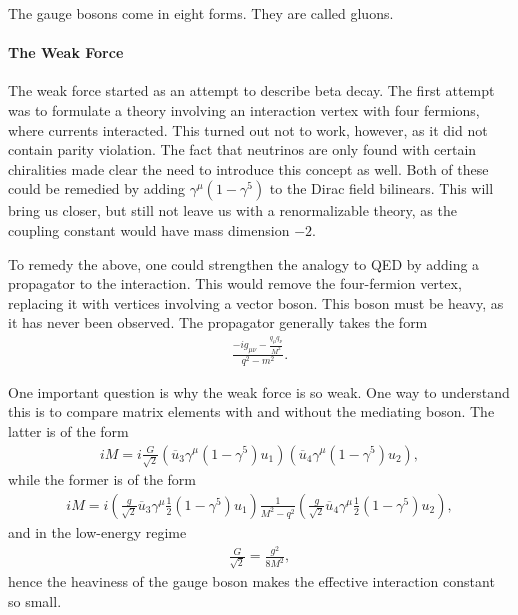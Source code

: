 The gauge bosons come in eight forms. They are called gluons.

\paragraph{The Weak Force}
The weak force started as an attempt to describe beta decay. The first attempt was to formulate a theory involving an interaction vertex with four fermions, where currents interacted. This turned out not to work, however, as it did not contain parity violation. The fact that neutrinos are only found with certain chiralities made clear the need to introduce this concept as well. Both of these could be remedied by adding $\gamma^{\mu}(1 - \gamma^{5})$ to the Dirac field bilinears. This will bring us closer, but still not leave us with a renormalizable theory, as the coupling constant would have mass dimension $-2$.

To remedy the above, one could strengthen the analogy to QED by adding a propagator to the interaction. This would remove the four-fermion vertex, replacing it with vertices involving a vector boson. This boson must be heavy, as it has never been observed. The propagator generally takes the form
\begin{align*}
	\frac{-ig_{\mu\nu} - \frac{q_{\mu}q_{\nu}}{M^{2}}}{q^{2} - m^{2}}.
\end{align*}

One important question is why the weak force is so weak. One way to understand this is to compare matrix elements with and without the mediating boson. The latter is of the form
\begin{align*}
	iM = i\frac{G}{\sqrt{2}}\left(\overline{u}_{3}\gamma^{\mu}(1 - \gamma^{5})u_{1}\right)\left(\overline{u}_{4}\gamma^{\mu}(1 - \gamma^{5})u_{2}\right),
\end{align*}
while the former is of the form
\begin{align*}
	iM = i\left(\frac{g}{\sqrt{2}}\overline{u}_{3}\gamma^{\mu}\frac{1}{2}(1 - \gamma^{5})u_{1}\right)\frac{1}{M^{2} - q^{2}}\left(\frac{g}{\sqrt{2}}\overline{u}_{4}\gamma^{\mu}\frac{1}{2}(1 - \gamma^{5})u_{2}\right),
\end{align*}
and in the low-energy regime
\begin{align*}
	\frac{G}{\sqrt{2}} = \frac{g^{2}}{8M^{2}},
\end{align*}
hence the heaviness of the gauge boson makes the effective interaction constant so small.
